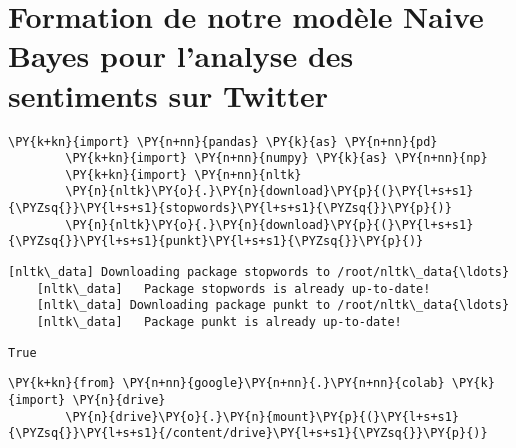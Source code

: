 \chapter{Formation de notre modèle Naive Bayes pour l'analyse des sentiments sur Twitter}
\label{naivebayesimplementation}
\begin{tcolorbox}[breakable, size=fbox, boxrule=1pt, pad at break*=1mm,colback=cellbackground, colframe=cellborder]
    \begin{Verbatim}[commandchars=\\\{\}]
        \PY{k+kn}{import} \PY{n+nn}{pandas} \PY{k}{as} \PY{n+nn}{pd}
        \PY{k+kn}{import} \PY{n+nn}{numpy} \PY{k}{as} \PY{n+nn}{np}
        \PY{k+kn}{import} \PY{n+nn}{nltk}
        \PY{n}{nltk}\PY{o}{.}\PY{n}{download}\PY{p}{(}\PY{l+s+s1}{\PYZsq{}}\PY{l+s+s1}{stopwords}\PY{l+s+s1}{\PYZsq{}}\PY{p}{)}
        \PY{n}{nltk}\PY{o}{.}\PY{n}{download}\PY{p}{(}\PY{l+s+s1}{\PYZsq{}}\PY{l+s+s1}{punkt}\PY{l+s+s1}{\PYZsq{}}\PY{p}{)}
    \end{Verbatim}
\end{tcolorbox}

\begin{Verbatim}[commandchars=\\\{\}]
    [nltk\_data] Downloading package stopwords to /root/nltk\_data{\ldots}
    [nltk\_data]   Package stopwords is already up-to-date!
    [nltk\_data] Downloading package punkt to /root/nltk\_data{\ldots}
    [nltk\_data]   Package punkt is already up-to-date!
\end{Verbatim}

\begin{tcolorbox}[breakable, size=fbox, boxrule=.5pt, pad at break*=1mm, opacityfill=0]
    \begin{Verbatim}[commandchars=\\\{\}]
        True
    \end{Verbatim}
\end{tcolorbox}

\begin{tcolorbox}[breakable, size=fbox, boxrule=1pt, pad at break*=1mm,colback=cellbackground, colframe=cellborder]
    \begin{Verbatim}[commandchars=\\\{\}]
        \PY{k+kn}{from} \PY{n+nn}{google}\PY{n+nn}{.}\PY{n+nn}{colab} \PY{k}{import} \PY{n}{drive}
        \PY{n}{drive}\PY{o}{.}\PY{n}{mount}\PY{p}{(}\PY{l+s+s1}{\PYZsq{}}\PY{l+s+s1}{/content/drive}\PY{l+s+s1}{\PYZsq{}}\PY{p}{)}
    \end{Verbatim}
\end{tcolorbox}

